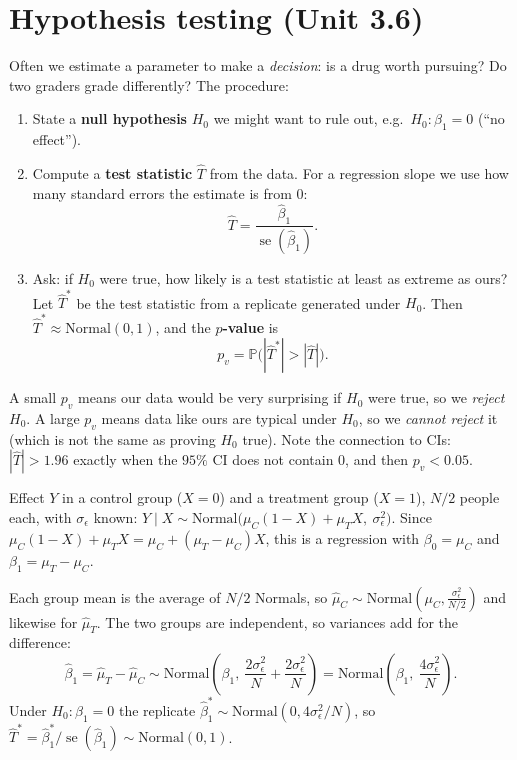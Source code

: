 \documentclass[11pt]{article}
\newcommand{\se}{\operatorname{se}}
\renewcommand{\P}{\mathbb{P}}
\newcommand{\given}{\mid}
\newcommand{\Norm}{\text{Normal}}
\begin{document}
\section{Hypothesis testing (Unit 3.6)}
Often we estimate a parameter to make a \emph{decision}: is a drug worth pursuing? Do two graders grade differently? The procedure:
\begin{enumerate}[leftmargin=*,itemsep=2pt]
\item State a \textbf{null hypothesis} $H_0$ we might want to rule out, e.g.\ $H_0:\beta_1=0$ (``no effect'').
\item Compute a \textbf{test statistic} $\hat T$ from the data. For a regression slope we use how many standard errors the estimate is from $0$:
\[\hat T=\frac{\hat\beta_1}{\se(\hat\beta_1)}.\]
\item Ask: if $H_0$ were true, how likely is a test statistic at least as extreme as ours? Let $\hat T^*$ be the test statistic from a
replicate generated under $H_0$. Then $\hat T^*\approx\Norm(0,1)$, and the \textbf{$p$-value} is
\[ p_v=\P\big(|\hat T^*|>|\hat T|\big). \]
\end{enumerate}
A small $p_v$ means our data would be very surprising if $H_0$ were true, so we \emph{reject} $H_0$. A large $p_v$ means data like ours are
typical under $H_0$, so we \emph{cannot reject} it (which is not the same as proving $H_0$ true). Note the connection to CIs: $|\hat T|>1.96$
exactly when the $95\%$ CI does not contain $0$, and then $p_v<0.05$.

\begin{examplebox}[title={Example (notes): a clinical trial is a binary-predictor regression}]
Effect $Y$ in a control group ($X=0$) and a treatment group ($X=1$), $N/2$ people each, with $\sigma_\epsilon$ known:
$Y\given X\sim\Norm\big(\mu_C(1-X)+\mu_TX,\ \sigma_\epsilon^2\big)$. Since $\mu_C(1-X)+\mu_TX=\mu_C+(\mu_T-\mu_C)X$, this is a regression
with $\beta_0=\mu_C$ and $\beta_1=\mu_T-\mu_C$.

Each group mean is the average of $N/2$ Normals, so $\hat\mu_C\sim\Norm(\mu_C,\frac{\sigma_\epsilon^2}{N/2})$ and likewise for $\hat\mu_T$.
The two groups are independent, so variances add for the difference:
\[
\hat\beta_1=\hat\mu_T-\hat\mu_C\sim\Norm\!\left(\beta_1,\ \frac{2\sigma_\epsilon^2}{N}+\frac{2\sigma_\epsilon^2}{N}\right)=\Norm\!\left(\beta_1,\ \frac{4\sigma_\epsilon^2}{N}\right).
\]
Under $H_0:\beta_1=0$ the replicate $\hat\beta_1^*\sim\Norm(0,4\sigma_\epsilon^2/N)$, so $\hat T^*=\hat\beta_1^*/\se(\hat\beta_1)\sim\Norm(0,1)$.
\end{examplebox}
\end{document}
